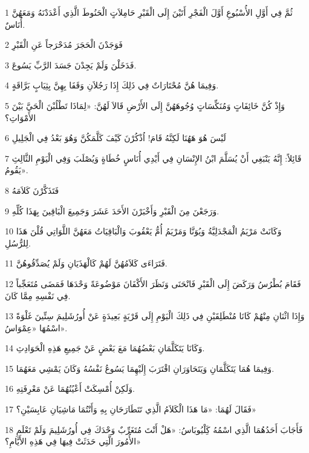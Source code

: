 \par 1 ثُمَّ فِي أَوَّلِ الأُسْبُوعِ أَوَّلَ الْفَجْرِ أَتَيْنَ إِلَى الْقَبْرِ حَامِلاَتٍ الْحَنُوطَ الَّذِي أَعْدَدْنَهُ وَمَعَهُنَّ أُنَاسٌ.
\par 2 فَوَجَدْنَ الْحَجَرَ مُدَحْرَجاً عَنِ الْقَبْرِ
\par 3 فَدَخَلْنَ وَلَمْ يَجِدْنَ جَسَدَ الرَّبِّ يَسُوعَ.
\par 4 وَفِيمَا هُنَّ مُحْتَارَاتٌ فِي ذَلِكَ إِذَا رَجُلاَنِ وَقَفَا بِهِنَّ بِثِيَابٍ بَرَّاقَةٍ.
\par 5 وَإِذْ كُنَّ خَائِفَاتٍ وَمُنَكِّسَاتٍ وُجُوهَهُنَّ إِلَى الأَرْضِ قَالاَ لَهُنَّ: «لِمَاذَا تَطْلُبْنَ الْحَيَّ بَيْنَ الأَمْوَاتِ؟
\par 6 لَيْسَ هُوَ هَهُنَا لَكِنَّهُ قَامَ! اُذْكُرْنَ كَيْفَ كَلَّمَكُنَّ وَهُوَ بَعْدُ فِي الْجَلِيلِ
\par 7 قَائِلاً: إِنَّهُ يَنْبَغِي أَنْ يُسَلَّمَ ابْنُ الإِنْسَانِ فِي أَيْدِي أُنَاسٍ خُطَاةٍ وَيُصْلَبَ وَفِي الْيَوْمِ الثَّالِثِ يَقُومُ».
\par 8 فَتَذَكَّرْنَ كَلاَمَهُ
\par 9 وَرَجَعْنَ مِنَ الْقَبْرِ وَأَخْبَرْنَ الأَحَدَ عَشَرَ وَجَمِيعَ الْبَاقِينَ بِهَذَا كُلِّهِ.
\par 10 وَكَانَتْ مَرْيَمُ الْمَجْدَلِيَّةُ وَيُوَنَّا وَمَرْيَمُ أُمُّ يَعْقُوبَ وَالْبَاقِيَاتُ مَعَهُنَّ اللَّوَاتِي قُلْنَ هَذَا لِلرُّسُلِ.
\par 11 فَتَرَاءَى كَلاَمُهُنَّ لَهُمْ كَالْهَذَيَانِ وَلَمْ يُصَدِّقُوهُنَّ.
\par 12 فَقَامَ بُطْرُسُ وَرَكَضَ إِلَى الْقَبْرِ فَانْحَنَى وَنَظَرَ الأَكْفَانَ مَوْضُوعَةً وَحْدَهَا فَمَضَى مُتَعَجِّباً فِي نَفْسِهِ مِمَّا كَانَ.
\par 13 وَإِذَا اثْنَانِ مِنْهُمْ كَانَا مُنْطَلِقَيْنِ فِي ذَلِكَ الْيَوْمِ إِلَى قَرْيَةٍ بَعِيدَةٍ عَنْ أُورُشَلِيمَ سِتِّينَ غَلْوَةً اسْمُهَا «عِمْوَاسُ».
\par 14 وَكَانَا يَتَكَلَّمَانِ بَعْضُهُمَا مَعَ بَعْضٍ عَنْ جَمِيعِ هَذِهِ الْحَوَادِثِ.
\par 15 وَفِيمَا هُمَا يَتَكَلَّمَانِ وَيَتَحَاوَرَانِ اقْتَرَبَ إِلَيْهِمَا يَسُوعُ نَفْسُهُ وَكَانَ يَمْشِي مَعَهُمَا.
\par 16 وَلَكِنْ أُمْسِكَتْ أَعْيُنُهُمَا عَنْ مَعْرِفَتِهِ.
\par 17 فَقَالَ لَهُمَا: «مَا هَذَا الْكَلاَمُ الَّذِي تَتَطَارَحَانِ بِهِ وَأَنْتُمَا مَاشِيَانِ عَابِسَيْنِ؟»
\par 18 فَأَجَابَ أَحَدُهُمَا الَّذِي اسْمُهُ كَِلْيُوبَاسُ: «هَلْ أَنْتَ مُتَغَرِّبٌ وَحْدَكَ فِي أُورُشَلِيمَ وَلَمْ تَعْلَمِ الأُمُورَ الَّتِي حَدَثَتْ فِيهَا فِي هَذِهِ الأَيَّامِ؟»
